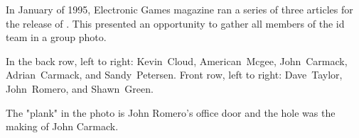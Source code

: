 \par
{
\setlength{\abovecaptionskip}{15pt}
}
\par





\begin{figure}
\end{figure}
\vspace{9pt}
In January of 1995, Electronic Games magazine ran a series of three articles for the release of \doomii{}. This presented an opportunity to gather all members of the id team in a group photo.\par
 \vspace{10pt}
 In the back row, left to right: Kevin~Cloud, American~Mcgee, John~Carmack, Adrian~Carmack, and Sandy~Petersen. Front row, left to right: Dave~Taylor, John~Romero, and Shawn~Green.\par
 \vspace{10pt}
 \par The "plank" in the photo is John Romero's office door and the hole was the making of John Carmack.\par
 \vspace{16pt}







